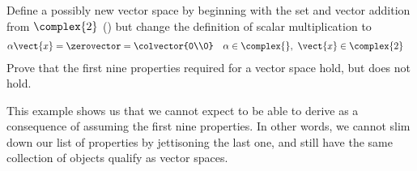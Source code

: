 Define a possibly new vector space by beginning with the set and vector addition from $\complex{2}$ () but change the definition of scalar multiplication to 
%
\begin{align*}
\alpha\vect{x}&=\zerovector=\colvector{0\\0}&&\alpha\in\complex{\null},\ \vect{x}\in\complex{2}
\end{align*}
%
Prove that the first nine properties required for a vector space hold, but  does not hold.\par
%
This example shows us that we cannot expect to be able to derive  as a consequence of assuming the first nine properties.  In other words, we cannot slim down our list of properties by jettisoning the last one, and still have the same collection of objects qualify as vector spaces.